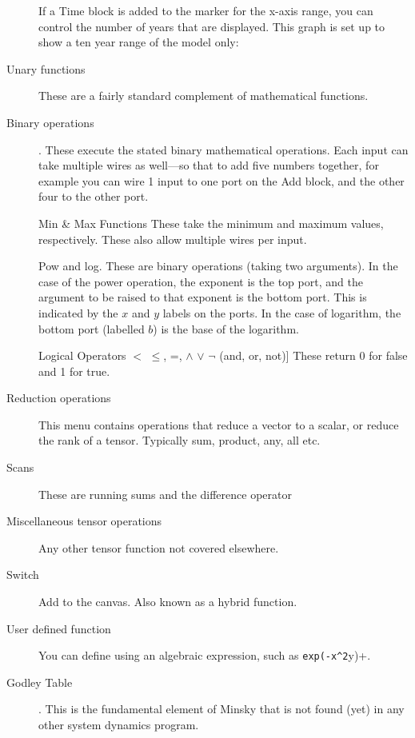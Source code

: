 \begin{description}
If a Time block is added to the marker for the x-axis range, you can
control the number of years that are displayed. This graph is set
up to show a ten year range of the model only:
\begin{center}
\par\end{center}
\item [{Unary functions}]  These are a fairly standard
complement of mathematical functions.
\item [{Binary operations}] . These execute the
stated binary mathematical operations. Each input can take multiple
wires as well---so that to add five numbers together, for example
you can wire 1 input to one port on the Add block, and the other four
to the other port.

Min \& Max Functions These take the minimum and maximum values, respectively.
These also allow multiple wires per input.

Pow and log. These are binary operations (taking two arguments). In
the case of the power operation, the exponent is the top port, and
the argument to be raised to that exponent is the bottom port. This
is indicated by the $x$ and $y$ labels on the ports. In the case
of logarithm, the bottom port (labelled $b$) is the base of the logarithm.

Logical Operators $<$ $\le$, =, $\wedge$ $\vee$ $\neg$ (and,
or, not){]} These return 0 for false and 1 for true.
\item [{Reduction operations}]  This menu contains
operations that reduce a vector to a scalar, or reduce the rank of
a tensor. Typically sum, product, any, all etc.
\item [{Scans}]  These are running sums and
the difference operator
\item [{Miscellaneous tensor operations}] 
Any other tensor function not covered elsewhere.
\item [{Switch}]  Add  to the canvas. Also known as a hybrid
function.
\item [{User defined function}]  You can
define  using
an algebraic expression, such as \verb+exp(-x^2+y)+.
\item [{Godley Table}] . \label{GodleyTable}
This is the fundamental element of Minsky that is not found (yet)
in any other system dynamics program.


\end{description}
